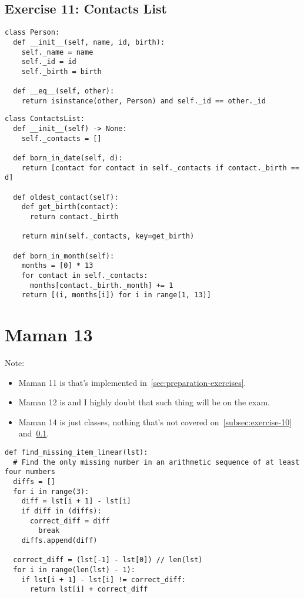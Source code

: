 \documentclass[11pt]{article}
\begin{document}
\subsection{Exercise 11: Contacts List}\label{subsec:exercise-11}

\begin{lstlisting}
class Person:
  def __init__(self, name, id, birth):
    self._name = name
    self._id = id
    self._birth = birth

  def __eq__(self, other):
    return isinstance(other, Person) and self._id == other._id
\end{lstlisting}

\begin{lstlisting}
class ContactsList:
  def __init__(self) -> None:
    self._contacts = []

  def born_in_date(self, d):
    return [contact for contact in self._contacts if contact._birth == d]

  def oldest_contact(self):
    def get_birth(contact):
      return contact._birth

    return min(self._contacts, key=get_birth)

  def born_in_month(self):
    months = [0] * 13
    for contact in self._contacts:
      months[contact._birth._month] += 1
    return [(i, months[i]) for i in range(1, 13)]
\end{lstlisting}

\section{Maman 13}
Note:
\begin{itemize}
  \item Maman 11 is  that's implemented in~\cref{sec:preparation-exercises}.
  \item Maman 12 is  and I highly doubt that such thing will be on the exam.
  \item Maman 14 is just classes, nothing that's not covered on~\cref{subsec:exercise-10} and~\cref{subsec:exercise-11}.
\end{itemize}

\pagebreak


\begin{lstlisting}
def find_missing_item_linear(lst):
  # Find the only missing number in an arithmetic sequence of at least four numbers
  diffs = []
  for i in range(3):
    diff = lst[i + 1] - lst[i]
    if diff in (diffs):
      correct_diff = diff
        break
    diffs.append(diff)
      
  correct_diff = (lst[-1] - lst[0]) // len(lst)
  for i in range(len(lst) - 1):
    if lst[i + 1] - lst[i] != correct_diff:
      return lst[i] + correct_diff
\end{lstlisting}
\end{document}
